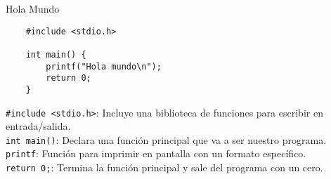 \documentclass[aspectratio=169]{beamer}
\begin{document}
\begin{frame}[fragile,t]{Hola Mundo}

    \begin{verbatim}
    #include <stdio.h>

    int main() {
        printf("Hola mundo\n");
        return 0;
    }
    \end{verbatim}
    \small
    \pause
    \textcolor{naranjauca}{\texttt{\#include <stdio.h>}}: Incluye una biblioteca de funciones para escribir en entrada/salida.\\
    \bigskip
    \pause
    \textcolor{naranjauca}{\texttt{int main()}}: Declara una función principal que va a ser nuestro programa.\\
    \bigskip
    \pause
    \textcolor{naranjauca}{\texttt{printf}}: Función para imprimir en pantalla con un formato específico.\\
    \bigskip
    \pause
    \textcolor{naranjauca}{\texttt{return 0;}}: Termina la función principal y sale del programa con un cero.\\
\end{frame}
\end{document}
